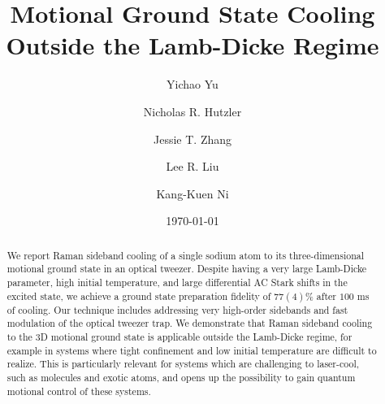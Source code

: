 \documentclass[aps,prl,twocolumn,groupedaddress]{revtex4-1}
\begin{document}
\title{Motional Ground State Cooling Outside the Lamb-Dicke Regime}
\author{Yichao Yu}
\author{Nicholas R. Hutzler}
\author{Jessie T. Zhang}
\author{Lee R. Liu}
\author{Kang-Kuen Ni}

\date{\today}

\begin{abstract}
  We report Raman sideband cooling of a single sodium atom to its three-dimensional
  motional ground state in an optical tweezer.
  Despite having a very large Lamb-Dicke parameter, high initial temperature, and
  large differential AC Stark shifts in the excited state,
  we achieve a ground state preparation fidelity of $77(4)$\% after $100$ ms of cooling.
  Our technique includes addressing very high-order sidebands and
  fast modulation of the optical tweezer trap.
  We demonstrate that Raman sideband cooling to the 3D motional ground state is applicable
  outside the Lamb-Dicke regime, for example in
  systems where tight confinement and low initial temperature are difficult to realize.
  This is particularly relevant for systems which are challenging to laser-cool,
  such as molecules and exotic atoms,
  and opens up the possibility to gain quantum motional control of these systems.
\end{abstract}

\maketitle
\end{document}
